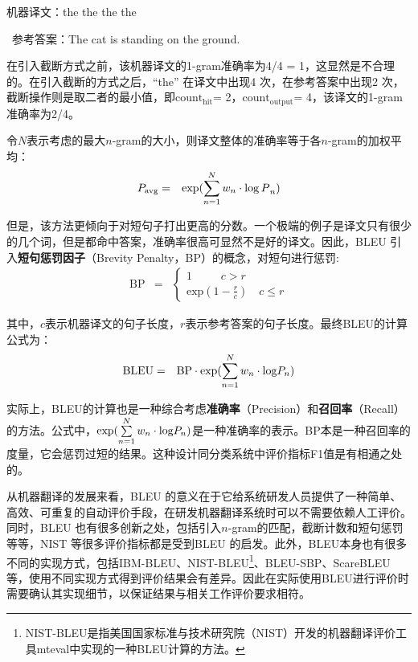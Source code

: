 \begin{example}
机器译文：the the the the

\qquad \ 参考答案：The cat is standing on the ground.
\label{eg:4-bleu-example}
\end{example}

\parinterval 在引入截断方式之前，该机器译文的1-gram准确率为4/4 = 1，这显然是不合理的。在引入截断的方式之后，“the” 在译文中出现4 次，在参考答案中出现2 次，截断操作则是取二者的最小值，即$\textrm{count}_{\textrm{hit}}$= 2，$\textrm{count}_{\textrm{output}}$= 4，该译文的1-gram准确率为2/4。

\parinterval 令$N$表示考虑的最大$n$-gram的大小，则译文整体的准确率等于各$n$-gram的加权平均：
\begin{eqnarray}
{{P}_{{\textrm{avg}}}} &=& \exp (\sum\limits_{n = 1}^N {{w_n} \cdot {{{\mathop{\log{P}}\nolimits} }_n}} )
\label{eq:4-5}
\end{eqnarray}

\parinterval 但是，该方法更倾向于对短句子打出更高的分数。一个极端的例子是译文只有很少的几个词，但是都命中答案，准确率很高可显然不是好的译文。因此，BLEU 引入{\small\sffamily\bfseries{短句惩罚因子}}（Brevity Penalty，BP）的概念，对短句进行惩罚:
\begin{eqnarray}
\textrm {BP} &=& \left\{ \begin{array}{l}
1\quad \quad \;\;c > r\\
{\textrm{exp}}(1 - \frac{r}{c})\quad c \le r
\end{array} \right.
\label{eq:4-6}
\end{eqnarray}

\noindent 其中，$c$表示机器译文的句子长度，$r$表示参考答案的句子长度。最终BLEU的计算公式为：
\begin{eqnarray}
\textrm {BLEU} &=& \textrm {BP} \cdot \exp(\sum\limits_{n = 1}^N {{w_n} \cdot {{{\mathop{\textrm {log}}\nolimits} }{P}_n}} )
\label{eq:4-7}
\end{eqnarray}

\parinterval 实际上，BLEU的计算也是一种综合考虑{\small\sffamily\bfseries{准确率}}（Precision）和{\small\sffamily\bfseries{召回率}}（Recall）的方法。公式中，$\exp(\sum\limits_{n = 1}^N {{w_n} \cdot {{{\mathop{\textrm {log}}\nolimits} }{P}_n}} )$是一种准确率的表示。BP本是一种召回率的度量，它会惩罚过短的结果。这种设计同分类系统中评价指标F1值是有相通之处的。

\parinterval 从机器翻译的发展来看，BLEU 的意义在于它给系统研发人员提供了一种简单、高效、可重复的自动评价手段，在研发机器翻译系统时可以不需要依赖人工评价。同时，BLEU 也有很多创新之处，包括引入$n$-gram的匹配，截断计数和短句惩罚等等，NIST 等很多评价指标都是受到BLEU 的启发。此外，BLEU本身也有很多不同的实现方式，包括IBM-BLEU、NIST-BLEU\footnote{NIST-BLEU是指美国国家标准与技术研究院（NIST）开发的机器翻译评价工具mteval中实现的一种BLEU计算的方法。}、BLEU-SBP、ScareBLEU等，使用不同实现方式得到评价结果会有差异。因此在实际使用BLEU进行评价时需要确认其实现细节，以保证结果与相关工作评价要求相符。

